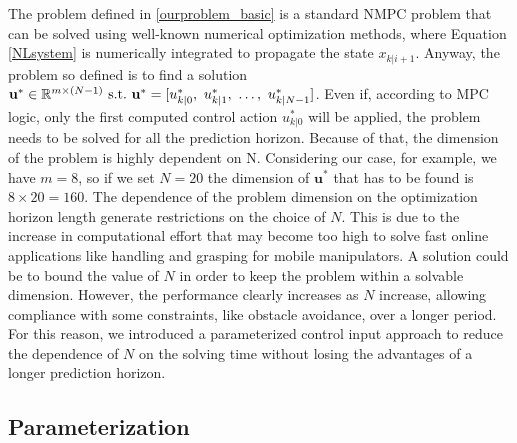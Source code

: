 The problem defined in \ref{ourproblem_basic} is a standard NMPC problem that can be solved using well-known numerical optimization methods, where Equation \ref{NLsystem} is numerically integrated to propagate the state ${x}_{k|i+1}$. Anyway, the problem so defined is to find a solution $\textbf{u}^* \in \mathbb{R}^{m\times(N-1)}\ \textnormal{s.t.}\ \textbf{u}^* =[{u}^*_{k|0},\ {u}^*_{k|1},\ \dots,\ {u}^*_{k|N-1}]$. Even if, according to MPC logic, only the first computed control action ${u}^*_{k|0}$ will be applied, the problem needs to be solved for all the prediction horizon. Because of that, the dimension of the problem is highly dependent on N. Considering our case, for example, we have $m=8$, so if we set $N=20$ the dimension of $\textbf{u}^*$ that has to be found is $8\times20=160$. The dependence of the problem dimension on the optimization horizon length generate restrictions on the choice of $N$. This is due to the increase in computational effort that may become too high to solve fast online applications like handling and grasping for mobile manipulators. A solution could be to bound the value of $N$ in order to keep the problem within a solvable dimension. However, the performance clearly increases as $N$ increase, allowing compliance with some constraints, like obstacle avoidance, over a longer period. For this reason, we introduced a parameterized control input approach to reduce the dependence of $N$ on the solving time without losing the advantages of a longer prediction horizon.

\subsection{Parameterization}

